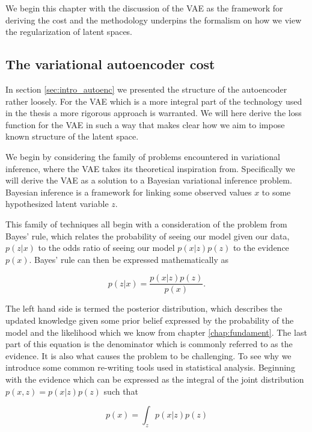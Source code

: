 We begin this chapter with the discussion of the VAE as the framework for deriving the cost and the methodology underpins the formalism on how we view the regularization of latent spaces.

\subsection{The variational autoencoder cost}

In section \ref{sec:intro_autoenc} we presented the structure of the autoencoder rather loosely. For the VAE which is a more integral part of the technology used in the thesis a more rigorous approach is warranted. We will here derive the loss function for the VAE in such a way that makes clear how we aim to impose known structure of the latent space.

 We begin by considering the family of problems encountered in variational inference, where the VAE takes its theoretical inspiration from. Specifically we will derive the VAE  as a solution to a Bayesian variational inference problem. Bayesian inference is a framework for linking some observed values $x$ to some hypothesized latent variable $z$. 

  This family of techniques all begin with a consideration of the problem from Bayes' rule, which relates the probability of seeing our model given our data, $p(z|x)$ to the odds ratio of seeing our model $p(x|z)p(z)$ to the evidence $p(x)$. Bayes' rule can then be expressed mathematically as 

 \begin{equation}\label{eq:bayes}
 p(z| x) = \frac{p(x|z) p(z)}{p(x)}.
 \end{equation}

 \noindent The left hand side is termed the posterior distribution, which describes the updated knowledge given some prior belief expressed by the probability of the model and the likelihood which we know from chapter \ref{chap:fundament}. The last part of this equation is the denominator which is commonly referred to as the evidence. It is also what causes the problem to be challenging. To see why we introduce some common re-writing tools used in statistical analysis. Beginning with the evidence which can be expressed as the integral of the joint distribution $p(x, z) = p(x|z)p(z)$ such that

\begin{equation}\label{eq:evidence}
p(x) = \int_z p(x|z)p(z)
\end{equation}

